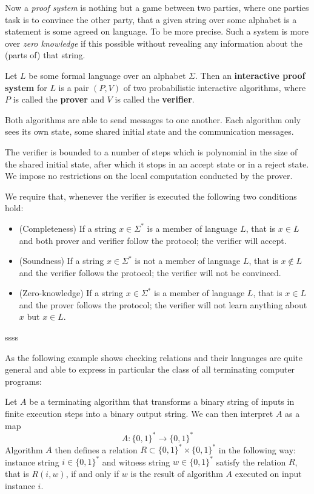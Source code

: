 Now a \textit{proof system} is nothing but a game between two parties, where one parties task is to convince the other party, that a given string over some alphabet is a statement is some agreed on language. To be more precise. Such a system is more over \textit{zero knowledge} if this possible without revealing any information about the (parts of) that string.
\begin{definition}
Let $L$ be some formal language over an alphabet $\Sigma$. Then an \textbf{interactive proof system} for $L$ is a pair $(P,V)$ of two probabilistic interactive algorithms, where $P$ is called the \textbf{prover} and $V$ is called the \textbf{verifier}. 

Both algorithms are able to send messages to one another. Each algorithm only sees its own state, some shared initial state and the communication messages. 

The verifier is bounded to a number of steps which is polynomial in the size of the shared initial state, after which it stops in an accept state or in a reject state. We impose no restrictions on the local computation conducted by the prover. 

We require that, whenever the verifier is executed the following two conditions hold:
\begin{itemize}
\item (Completeness) If a string $x\in \Sigma^*$ is a member of language $L$, that is $x\in L$ and both prover and verifier follow the protocol; the verifier will accept.
\item (Soundness) If a string $x\in \Sigma^*$ is not a member of language $L$, that is $x\notin L$ and the verifier follows the protocol; the verifier will not be convinced.
\item (Zero-knowledge) If a string $x\in \Sigma^*$ is a member of language $L$, that is $x\in L$ and the prover follows the protocol; the verifier will not learn anything about $x$ but $x\in L$.
\end{itemize}
\end{definition}

\begin{example}
ssss
\end{example}

As the following example shows checking relations and their languages are quite general and able to express in particular the class of all terminating computer programs:
\begin{example} Let $A$ be a terminating algorithm that transforms a binary string of inputs in finite execution steps into a binary output string. We can then interpret $A$ as a map 
$$
A :\{0,1\}^* \to \{0,1\}^*
$$
Algorithm $A$ then defines a relation
$R\subset \{0,1\}^* \times \{0,1\}^*$ in the following way: instance string $i\in \{0,1\}^*$ and witness string $w\in \{0,1\}^*$ satisfy the relation $R$, that is $R(i,w)$, if and only if $w$ is the result of algorithm $A$ executed on input instance $i$.
\end{example}

